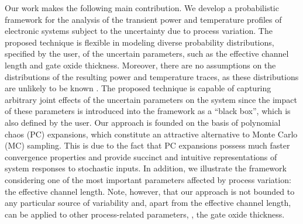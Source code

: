Our work makes the following main contribution.
We develop a probabilistic framework for the analysis of the transient power and temperature profiles of electronic systems subject to the uncertainty due to process variation.
The proposed technique is flexible in modeling diverse probability distributions, specified by the user, of the uncertain parameters, such as the effective channel length and gate oxide thickness.
Moreover, there are no assumptions on the distributions of the resulting power and temperature traces, as these distributions are unlikely to be known \apriori.
The proposed technique is capable of capturing arbitrary joint effects of the uncertain parameters on the system since the impact of these parameters is introduced into the framework as a ``black box'', which is also defined by the user.
Our approach is founded on the basis of polynomial chaos (PC) expansions, which constitute an attractive alternative to Monte Carlo (MC) sampling.
This is due to the fact that PC expansions possess much faster convergence properties and provide succinct and intuitive representations of system responses to stochastic inputs.
In addition, we illustrate the framework considering one of the most important parameters affected by process variation: the effective channel length.
Note, however, that our approach is not bounded to any particular source of variability and, apart from the effective channel length, can be applied to other process-related parameters, \eg, the gate oxide thickness.
